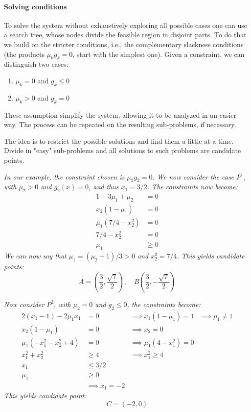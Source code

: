 \paragraph{Solving conditions} To solve the system without exhaustively exploring all possible cases one can use a search tree, whose nodes divide the feasible region in disjoint parts. To do that we build on the stricter conditions, i.e., the complementary slackness conditions (the products $\mu_k g_k = 0$, start with the simplest one). Given a constraint, we can distinguish two cases:
\begin{enumerate}
	\item $\mu_k = 0$ and $g_k \leq 0$
	
	\item $\mu_k > 0$ and $g_k = 0$
\end{enumerate}

These assumption simplify the system, allowing it to be analyzed in an easier way. The process can be repeated on the resulting sub-problems, if necessary.

The idea is to restrict the possible solutions and find them a little at a time. Divide in "easy" sub-problems and all solutions to such problems are candidate points.

\textit{In our example, the constraint chosen is $\mu_2 g_2 = 0$. We now consider the case $P^1$, with $\mu_2 > 0$ and $g_2 (x) = 0$, and thus $x_1 = 3/2$. The constraints now become:
\begin{align*}
	1 - 3 \mu_1 + \mu_2 & = 0 \\
	x_2 (1 - \mu_1) & = 0 \\
	\mu_1 (7/4 - x_2^2) & = 0 \\
	7/4 - x_2^2 & = 0 \\
	\mu_1 & \geq 0
\end{align*}
We can now say that $\mu_1 = (\mu_2 + 1)/3 > 0$ and $x_2^2 = 7/4$. This yields candidate points:
$$ A = \left(\frac{3}{2}, \frac{\sqrt{7}}{2}\right), \quad B \left(\frac{3}{2}, - \frac{\sqrt{7}}{2}\right) $$
}

\textit{Now consider $P^2$, with $\mu_2 = 0$ and $g_2 \leq 0$, the constraints become:
\begin{align*}
	2(x_1 - 1) - 2 \mu_1 x_1 & = 0 & \implies x_1 (1 - \mu_1) = 1 & \implies \mu_1 \neq 1 \\
	x_2 (1 - \mu_1) & = 0 & \implies x_2 = 0 \\
	\mu_1(-x_1^2 -x_2^2 + 4) & = 0 & \implies \mu_1 (4 - x_1^2) = 0 \\
	x_1^2 + x_2^2 & \geq 4 & \implies x_1^2 \geq 4 \\
	x_1 & \leq 3/2 \\
	\mu_1 & \geq 0 \\
	& \implies x_1 = -2
\end{align*}
This yields candidate point:
$$ C = \left(-2, 0\right)$$}

